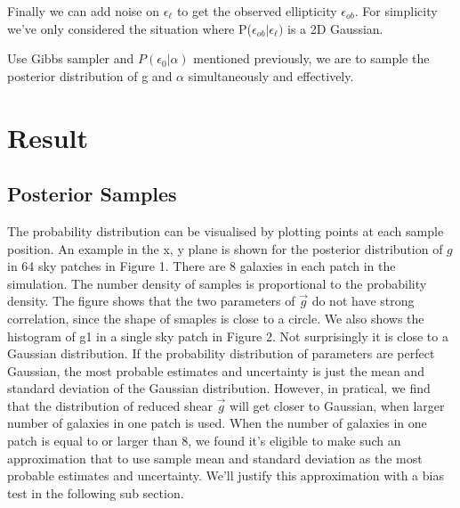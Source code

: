 \documentclass[useAMS,usenatbib]{mn2e}
\begin{document}
Finally we can add noise on $\epsilon_{\ell}$ to get the
observed ellipticity $\epsilon_{ob}$. For simplicity we've only considered
the situation where P($\epsilon_{ob}|\epsilon_{\ell})$ is a 2D Gaussian.

Use Gibbs sampler and $P(\epsilon_{0}|\alpha)$ mentioned previously, we
are to sample the posterior distribution of g and $\alpha$ simultaneously
and effectively.




\section{Result}

\label{sec:XXX}


\subsection{Posterior Samples}
The probability distribution can be visualised by plotting points at each sample
position. An example in the x, y plane is shown for the posterior distribution of
$g$ in 64 sky patches in Figure 1. There are 8 galaxies in each patch in the simulation.
The number density of samples is proportional to the probability density. The figure shows that the two parameters of $\vec{g}$
do not have strong correlation, since the shape of smaples is close to a circle.
We also shows the histogram of g1 in a single sky patch in Figure 2. Not surprisingly it is close to a Gaussian distribution.
If the probability distribution of parameters are perfect Gaussian, the most probable estimates and uncertainty 
is just the mean and standard deviation of the Gaussian distribution. However, in pratical, we find that the distribution 
of reduced shear $\vec{g}$ will  get closer to Gaussian, when larger number of galaxies in one patch  is used. When the number of galaxies in 
one patch is equal to or larger than 8, we found it's eligible to make such an approximation that to use sample mean and standard 
deviation as the most probable estimates and uncertainty. We'll justify this approximation with a bias test in the following
sub section. 
\end{document}
